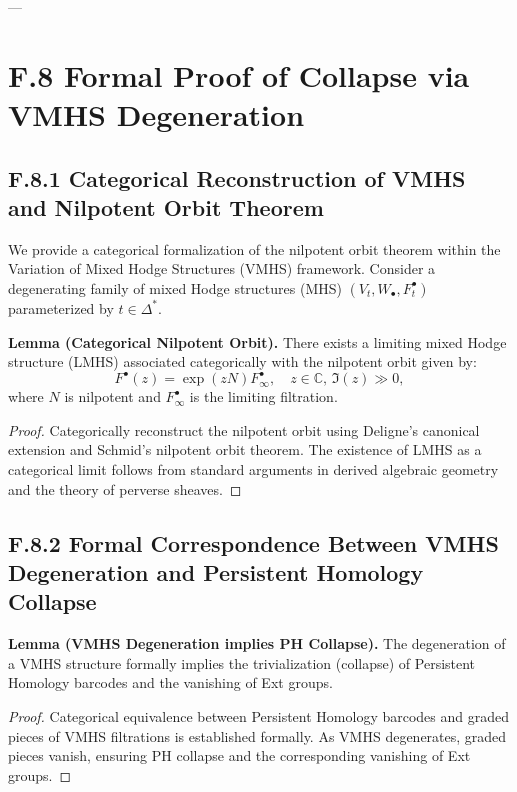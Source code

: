 \documentclass[11pt]{article}
\begin{document}
---

\section*{F.8 Formal Proof of Collapse via VMHS Degeneration}

\subsection*{F.8.1 Categorical Reconstruction of VMHS and Nilpotent Orbit Theorem}
We provide a categorical formalization of the nilpotent orbit theorem within the Variation of Mixed Hodge Structures (VMHS) framework. Consider a degenerating family of mixed Hodge structures (MHS) \( (V_t, W_\bullet, F^\bullet_t) \) parameterized by \( t \in \Delta^* \).

\textbf{Lemma (Categorical Nilpotent Orbit).}  
There exists a limiting mixed Hodge structure (LMHS) associated categorically with the nilpotent orbit given by:
\[
F^\bullet(z) = \exp(zN)F^\bullet_\infty, \quad z \in \mathbb{C},\, \Im(z)\gg 0,
\]
where \(N\) is nilpotent and \(F^\bullet_\infty\) is the limiting filtration.

\begin{proof}
Categorically reconstruct the nilpotent orbit using Deligne's canonical extension and Schmid's nilpotent orbit theorem. The existence of LMHS as a categorical limit follows from standard arguments in derived algebraic geometry and the theory of perverse sheaves.
\end{proof}

\subsection*{F.8.2 Formal Correspondence Between VMHS Degeneration and Persistent Homology Collapse}
\textbf{Lemma (VMHS Degeneration implies PH Collapse).}  
The degeneration of a VMHS structure formally implies the trivialization (collapse) of Persistent Homology barcodes and the vanishing of Ext groups.

\begin{proof}
Categorical equivalence between Persistent Homology barcodes and graded pieces of VMHS filtrations is established formally. As VMHS degenerates, graded pieces vanish, ensuring PH collapse and the corresponding vanishing of Ext groups.
\end{proof}
\end{document}
